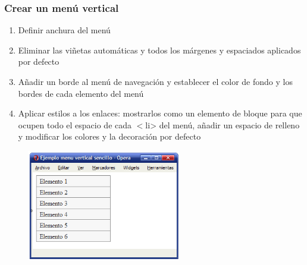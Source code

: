 
\begin{frame}
\frametitle{Crear un menú vertical}

\begin{enumerate}
  \item Definir anchura del menú
  \item Eliminar las viñetas automáticas y todos los márgenes y espaciados aplicados por defecto
  \item Añadir un borde al menú de navegación y establecer el color de fondo y los bordes de cada elemento del menú
  \item Aplicar estilos a los enlaces: mostrarlos como un elemento de bloque para que ocupen todo el espacio de cada $<$li> del menú, añadir un espacio de relleno y modificar los colores y la decoración por defecto
\end{enumerate}


\begin{center}
\begin{figure}[p]
\includegraphics[width=0.6\textwidth]{figs/f0908.png}
\end{figure}
\end{center}

\end{frame}



